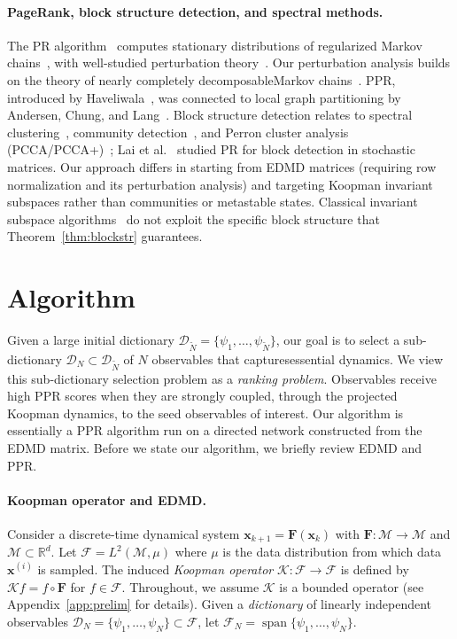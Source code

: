 \documentclass{article}
\theoremstyle{plain}
\theoremstyle{definition}
\DeclareMathOperator{\Span}{span}
\def\R{\mathbb{R}}
\def\x{\mathbf{x}}
\def\Koop{\mathcal{K}}
\def\Fc{\mathcal{F}}
\def\Dc{\mathcal{D}}
\def\Mc{\mathcal{M}}
\newcommand{\arXivtag}[1][]{#1}
\begin{document}
	\paragraph{PageRank, block structure detection, and spectral methods.}
	The PR algorithm~\cite{PageRank1998} computes stationary distributions of regularized Markov chains~\cite{langville2004deeper}, with well-studied perturbation theory~\cite{ipsen2006pagerank, meyer1989stochastic}. Our perturbation analysis builds on the theory of nearly completely decomposable\arXivtag Markov chains~\cite{simon1961aggregation, courtois1977decomposability}. PPR, introduced by Haveliwala~\cite{haveliwala2003topic}, was connected to local graph partitioning by Andersen, Chung, and Lang~\cite{andersen2006local}. Block structure detection relates to spectral clustering~\cite{von2007tutorial}, community detection~\cite{fortunato2010community}, and Perron cluster analysis (PCCA/PCCA+)~\cite{deuflhard2005robust, roblitz2013fuzzy}; Lai et al.~\cite{lai2010finding} studied PR for block detection in stochastic matrices. Our approach differs in starting from EDMD matrices (requiring row normalization and its perturbation analysis) and targeting Koopman invariant subspaces rather than communities or metastable states. Classical invariant subspace algorithms~\cite{golub2013matrix, stewart2001matrix} do not exploit the specific block structure that Theorem~\ref{thm:blockstr} guarantees.
	
	
	\section{Algorithm}\label{sec:algorithm}
	Given a large initial dictionary $\Dc_{\tilde{N}} = \{\psi_1,\ldots,\psi_{\tilde{N}}\}$, our goal is to select a sub-dictionary $\Dc_N \subset \Dc_{\tilde{N}}$ of $N$ observables that captures\arXivtag essential dynamics.
	We view this sub-dictionary selection problem as a \textit{ranking problem}. Observables receive high PPR scores when they are strongly coupled, through the projected Koopman dynamics, to the seed observables of interest. Our algorithm is essentially a \arXivtag[PPR] algorithm run on a directed network constructed from the EDMD matrix. Before we state our algorithm, we briefly review EDMD and PPR.
	\paragraph{Koopman operator and EDMD.}
	Consider a discrete-time dynamical system $\x_{k+1} = \mathbf{F}(\x_k)$ with $\mathbf{F}:\Mc \to \Mc$ and $\Mc \subset \R^d$. Let $\Fc = L^2(\Mc, \mu)$ where $\mu$ is the data distribution from which data $\mathbf{x}^{(i)}$ is sampled.
	The induced \emph{Koopman operator} $\Koop:\Fc\to\Fc$ is defined by $\Koop f = f\circ\mathbf{F}$ for $f\in \Fc$. Throughout, we assume $\Koop$ is a bounded operator (see Appendix~\ref{app:prelim} for details). 
	Given a \emph{dictionary} of linearly independent observables $\Dc_N = \{\psi_1, \ldots, \psi_N\} \subset \Fc$, let $\Fc_N = \Span\{\psi_1, \ldots, \psi_N\}$.
	
\end{document}
